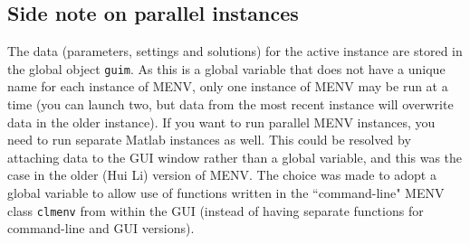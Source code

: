 \documentclass[../menv_main.tex]{subfiles}
\begin{document}
\subsection{Side note on parallel instances}
The data (parameters, settings and solutions) for the active instance are stored in the global object \verb|guim|. As this is a global variable that does not have a unique name for each instance of MENV, only one instance of MENV may be run at a time (you can launch two, but data from the most recent instance will overwrite data in the older instance). If you want to run parallel MENV instances, you need to run separate Matlab instances as well. This could be resolved by attaching data to the GUI window rather than a global variable, and this was the case in the older (Hui Li) version of MENV. The choice was made to adopt a global variable to allow use of functions written in the ``command-line" MENV class \verb|clmenv| from within the GUI (instead of having separate functions for command-line and GUI versions).
\end{document}
